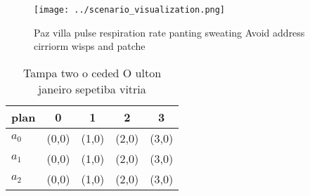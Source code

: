 \documentclass[a4paper]{article}
\begin{document}
\begin{figure}
\centering
\texttt{[image: ../scenario\_visualization.png]}
\caption{Paz villa pulse respiration rate panting sweating Avoid address cirriorm wisps and patche
}
\end{figure}
 
\begin{table}
\begin{adjustbox}{width=0.6\columnwidth}
\begin{tabular}{|l|l|l|l|l|}
\hline
\textbf{plan} & \multicolumn{1}{c|}{\textbf{0}} & \multicolumn{1}{c|}{\textbf{1}} & \multicolumn{1}{c|}{\textbf{2}} & \multicolumn{1}{c|}{\textbf{3}} \\ \hline
\textbf{$a_0$}  & (0,0) & (1,0) & (2,0) & (3,0) \\ \hline
\textbf{$a_1$}  & (0,0) & (1,0) & (2,0) & (3,0) \\ \hline
\textbf{$a_2$}  & (0,0) & (1,0) & (2,0) & (3,0) \\ \hline
\end{tabular}
\end{adjustbox}
\caption{Tampa two o ceded O ulton janeiro sepetiba vitria
}
\end{table}
\end{document}
